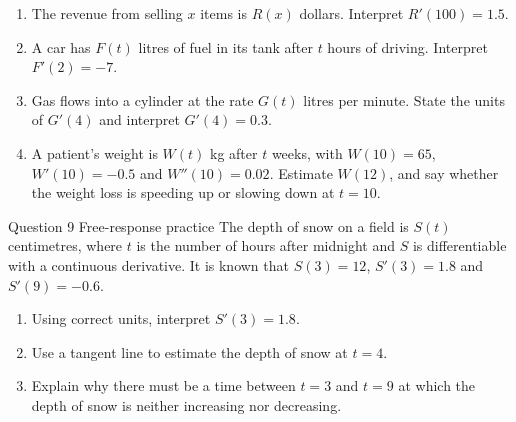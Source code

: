 \documentclass[11pt]{article}
\begin{document}
\begin{enumerate}[leftmargin=*,itemsep=2pt,start=5]
  \item The revenue from selling $x$ items is $R(x)$ dollars. Interpret $R'(100)=1.5$.\work{2.8cm}
  \item A car has $F(t)$ litres of fuel in its tank after $t$ hours of driving. Interpret $F'(2)=-7$.\work{2.8cm}
  \item Gas flows into a cylinder at the rate $G(t)$ litres per minute. State the units of $G'(4)$ and interpret $G'(4)=0.3$.\work{2.8cm}
  \item A patient's weight is $W(t)$ kg after $t$ weeks, with $W(10)=65$, $W'(10)=-0.5$ and $W''(10)=0.02$. Estimate $W(12)$, and say whether the weight loss is speeding up or slowing down at $t=10$.\work{2.8cm}
\end{enumerate}

\begin{frbox}{Question 9 \textperiodcentered{} Free-response practice}
The depth of snow on a field is $S(t)$ centimetres, where $t$ is the number of hours after midnight and $S$ is differentiable with a continuous derivative. It is known that $S(3)=12$, $S'(3)=1.8$ and $S'(9)=-0.6$.
\begin{enumerate}[label=(\alph*),leftmargin=*,itemsep=2pt]
  \item Using correct units, interpret $S'(3)=1.8$.\work{2.6cm}
  \item Use a tangent line to estimate the depth of snow at $t=4$.\work{2.6cm}
  \item Explain why there must be a time between $t=3$ and $t=9$ at which the depth of snow is neither increasing nor decreasing.\work{2.6cm}
\end{enumerate}
\end{frbox}
\end{document}
